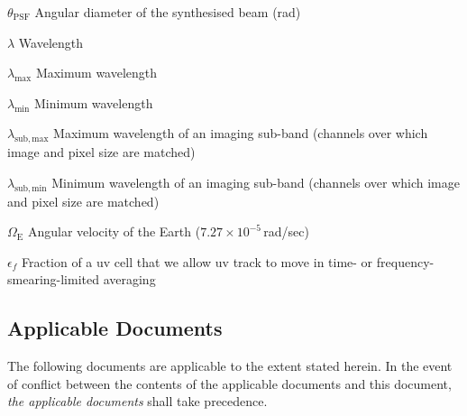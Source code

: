 \documentclass[11pt,a4paper]{article}
\newcommand{\beamdiam}{\theta_\mathrm{PSF}} %
\newcommand{\wavel}{\lambda} %
\newcommand{\maxwavel}{\lambda_\mathrm{max}} %
\newcommand{\minwavel}{\lambda_\mathrm{min}} %
\newcommand{\maxwavelsubb}{\lambda_{\mathrm{sub,max}}} %
\newcommand{\minwavelsubb}{\lambda_\mathrm{sub,min}} %
\newcommand{\earthrot}{\Omega_\mathrm{E}} %
\newcommand{\epsilonf}{\epsilon_f}  %
\begin{document}
\begin{basedescript}{\desclabelstyle{\pushlabel}\desclabelwidth{6em}}
\item[$\beamdiam$] Angular diameter of the synthesised beam (rad)
  \vspace{-0.2cm}
\item[$\wavel$] Wavelength \vspace{-0.2cm}
\item[$\maxwavel$] Maximum wavelength \vspace{-0.2cm}
\item[$\minwavel$] Minimum wavelength \vspace{-0.2cm}
\item[$\maxwavelsubb$] Maximum wavelength of an imaging sub-band (channels
  over which image and pixel size are matched) \vspace{-0.2cm}
\item[$\minwavelsubb$] Minimum wavelength of an imaging sub-band (channels
  over which image and pixel size are matched) \vspace{-0.2cm}
\item[$\earthrot$] Angular velocity of the Earth
  ($7.27\times10^{-5}$\,rad/sec) \vspace{-0.2cm}
\item[$\epsilonf$] Fraction of a uv cell that we allow uv track to move in time- or frequency- smearing-limited averaging \vspace{-0.2cm}
\end{basedescript}

\sdplistoffigures

\sdplistoftables

\sdpsummary


\newpage

\sdpreferencedocs

\subsection*{Applicable Documents}

The following documents are applicable to the extent stated herein. In the
event of conflict between the contents of the applicable documents and this
document, \emph{the applicable documents} shall take precedence.
\end{document}
